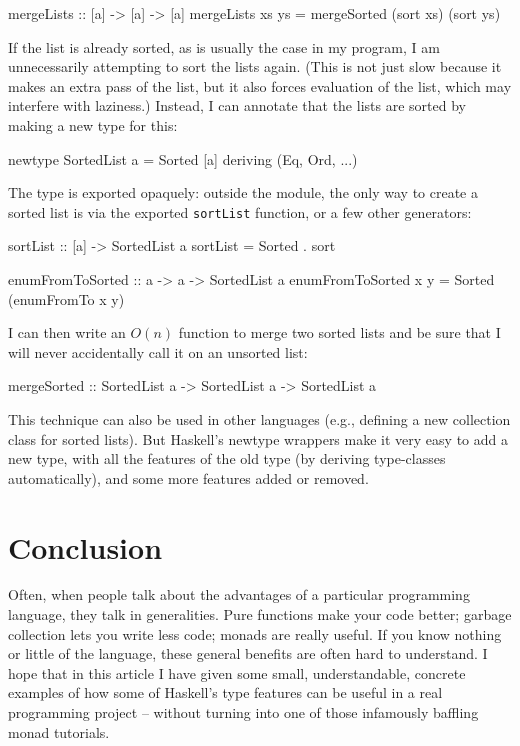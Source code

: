 \documentclass{tmr}
\begin{document}
\begin{code}
mergeLists :: [a] -> [a] -> [a]
mergeLists xs ys = mergeSorted (sort xs) (sort ys)
\end{code}

If the list is already sorted, as is usually the case in my program, I am unnecessarily attempting to sort the lists again.  (This is not just slow because it makes an extra pass of the list, but it also forces evaluation of the list, which may interfere with laziness.)  Instead, I can annotate that the lists are sorted by making a new type for this:

\begin{code}
newtype SortedList a = Sorted [a] deriving (Eq, Ord, ...)
\end{code}

The type is exported opaquely: outside the module, the only way to create a sorted list is via the exported \lstinline|sortList| function, or a few other generators:

\begin{code}
sortList :: [a] -> SortedList a
sortList = Sorted . sort

enumFromToSorted :: a -> a -> SortedList a
enumFromToSorted x y = Sorted (enumFromTo x y)
\end{code}

I can then write an $O(n)$ function to merge two sorted lists and be sure that I will never accidentally call it on an unsorted list:

\begin{code}
mergeSorted :: SortedList a -> SortedList a -> SortedList a
\end{code}

This technique can also be used in other languages (e.g., defining a new collection class for sorted lists).  But Haskell's newtype wrappers make it very easy to add a new type, with all the features of the old type (by deriving type-classes automatically), and some more features added or removed.

\section{Conclusion}

Often, when people talk about the advantages of a particular programming language, they talk in generalities.  Pure functions make your code better; garbage collection lets you write less code; monads are really useful.  If you know nothing or little of the language, these general benefits are often hard to understand.  I hope that in this article I have given some small, understandable, concrete examples of how some of Haskell's type features can be useful in a real programming project -- without turning into one of those infamously baffling monad tutorials.
\end{document}
